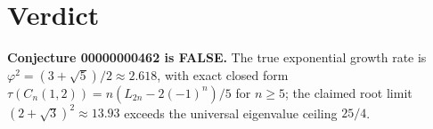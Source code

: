 \documentclass[11pt]{article}
\theoremstyle{remark}
\begin{document}
\section{Verdict}

\begin{center}
\textbf{Conjecture 00000000462 is FALSE.} The true exponential growth rate is
$\varphi^2 = (3+\sqrt5)/2 \approx 2.618$, with exact closed form
$\tau(C_n(1,2)) = n(L_{2n}-2(-1)^n)/5$ for $n \ge 5$; the claimed root limit
$(2+\sqrt3)^2 \approx 13.93$ exceeds the universal eigenvalue ceiling $25/4$.
\end{center}
\end{document}
